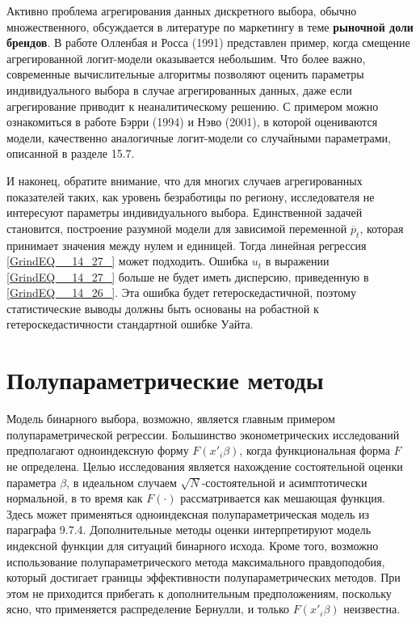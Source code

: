 Активно проблема агрегирования данных дискретного выбора,  обычно множественного,  обсуждается в литературе по маркетингу в теме \textbf{рыночной доли брендов}. В работе Олленбая и Росса  (1991)  представлен пример,  когда смещение агрегированной логит-модели оказывается небольшим. Что более важно,  современные вычислительные алгоритмы позволяют оценить параметры индивидуального выбора в случае агрегированных данных,  даже если агрегирование приводит к неаналитическому решению. С примером можно ознакомиться в работе Бэрри  (1994)  и Нэво  (2001),  в которой оцениваются модели,  качественно  аналогичные  логит-модели со случайными параметрами,  описанной в разделе 15.7.

И наконец,  обратите внимание,  что для многих случаев агрегированных показателей таких,  как уровень безработицы по региону,  исследователя не интересуют параметры индивидуального выбора. Единственной задачей становится,  построение разумной модели для зависимой переменной $\overline{p}_t$,  которая принимает значения между нулем и единицей. Тогда линейная регрессия \eqref{GrindEQ__14_27_} может подходить. Ошибка $u_t$ в выражении \eqref{GrindEQ__14_27_} больше не будет иметь дисперсию,  приведенную в \eqref{GrindEQ__14_26_}. Эта ошибка будет гетероскедастичной,  поэтому статистические выводы должны быть основаны на робастной к гетероскедастичности стандартной ошибке Уайта.

\section{Полупараметрические методы}

Модель бинарного выбора,  возможно,  является главным примером полупараметрической регрессии. Большинство эконометрических исследований предполагают одноиндексную форму $F(x'_i\beta )$,  когда функциональная форма $F$ не определена. Целью исследования является нахождение состоятельной оценки параметра $\beta$,  в идеальном случаем $\sqrt{N}$-состоятельной и асимптотически нормальной,  в то время как $F(\cdot )$ рассматривается как мешающая функция. Здесь может применяться одноиндексная полупараметрическая модель из параграфа 9.7.4. Дополнительные методы оценки интерпретируют модель индексной функции для ситуаций бинарного исхода. 
Кроме того,  возможно использование полупараметрического метода максимального правдоподобия,  который достигает границы эффективности полупараметрических методов. При этом не приходится прибегать к  дополнительным предположениям,  поскольку ясно,  что применяется распределение Бернулли,  и только $F(x'_i\beta )$ неизвестна.

